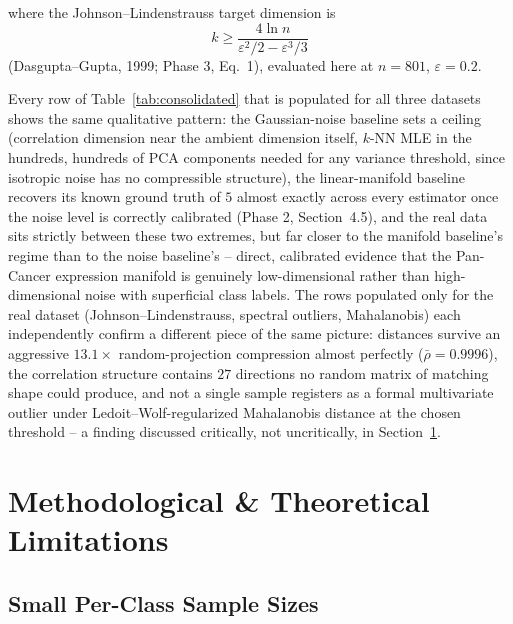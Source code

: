 \documentclass[11pt]{article}
\begin{document}
\noindent where the Johnson--Lindenstrauss target dimension is
\begin{equation}
k \geq \frac{4 \ln n}{\varepsilon^2/2 - \varepsilon^3/3}
\label{eq:jl-recap}
\end{equation}
(Dasgupta--Gupta, 1999; Phase 3, Eq.~1), evaluated here at $n=801$,
$\varepsilon=0.2$.

Every row of Table~\ref{tab:consolidated} that is populated for all three
datasets shows the same qualitative pattern: the Gaussian-noise baseline
sets a ceiling (correlation dimension near the ambient dimension itself,
$k$-NN MLE in the hundreds, hundreds of PCA components needed for any
variance threshold, since isotropic noise has no compressible structure),
the linear-manifold baseline recovers its known ground truth of $5$ almost
exactly across every estimator once the noise level is correctly calibrated
(Phase 2, Section~4.5), and the real data sits strictly between these two
extremes, but far closer to the manifold baseline's regime than to the
noise baseline's -- direct, calibrated evidence that the Pan-Cancer
expression manifold is genuinely low-dimensional rather than
high-dimensional noise with superficial class labels. The rows populated
only for the real dataset (Johnson--Lindenstrauss, spectral outliers,
Mahalanobis) each independently confirm a different piece of the same
picture: distances survive an aggressive $13.1\times$ random-projection
compression almost perfectly ($\bar\rho = 0.9996$), the correlation
structure contains $27$ directions no random matrix of matching shape could
produce, and not a single sample registers as a formal multivariate outlier
under Ledoit--Wolf-regularized Mahalanobis distance at the chosen
threshold -- a finding discussed critically, not uncritically, in
Section~\ref{sec:limitations}.

\section{Methodological \& Theoretical Limitations}
\label{sec:limitations}

\subsection{Small Per-Class Sample Sizes}
\end{document}
